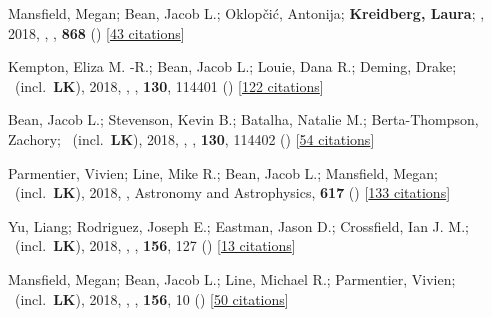 \item[{\color{numcolor}\scriptsize25}] Mansfield, Megan; Bean, Jacob L.; Oklop{\v{c}}i{\'c}, Antonija; \textbf{Kreidberg, Laura}; \etal, 2018, , \apj, \textbf{868} () [\href{https://ui.adsabs.harvard.edu/abs/2018ApJ...868L..34M}{43 citations}]

\item[{\color{numcolor}\scriptsize24}] Kempton, Eliza M. -R.; Bean, Jacob L.; Louie, Dana R.; Deming, Drake; \etal\ (incl.\ \textbf{LK}), 2018, , \pasp, \textbf{130}, 114401 () [\href{https://ui.adsabs.harvard.edu/abs/2018PASP..130k4401K}{122 citations}]

\item[{\color{numcolor}\scriptsize23}] Bean, Jacob L.; Stevenson, Kevin B.; Batalha, Natalie M.; Berta-Thompson, Zachory; \etal\ (incl.\ \textbf{LK}), 2018, , \pasp, \textbf{130}, 114402 () [\href{https://ui.adsabs.harvard.edu/abs/2018PASP..130k4402B}{54 citations}]

\item[{\color{numcolor}\scriptsize22}] Parmentier, Vivien; Line, Mike R.; Bean, Jacob L.; Mansfield, Megan; \etal\ (incl.\ \textbf{LK}), 2018, , Astronomy and Astrophysics, \textbf{617} () [\href{https://ui.adsabs.harvard.edu/abs/2018A&A...617A.110P}{133 citations}]

\item[{\color{numcolor}\scriptsize21}] Yu, Liang; Rodriguez, Joseph E.; Eastman, Jason D.; Crossfield, Ian J. M.; \etal\ (incl.\ \textbf{LK}), 2018, , \aj, \textbf{156}, 127 () [\href{https://ui.adsabs.harvard.edu/abs/2018AJ....156..127Y}{13 citations}]

\item[{\color{numcolor}\scriptsize20}] Mansfield, Megan; Bean, Jacob L.; Line, Michael R.; Parmentier, Vivien; \etal\ (incl.\ \textbf{LK}), 2018, , \aj, \textbf{156}, 10 () [\href{https://ui.adsabs.harvard.edu/abs/2018AJ....156...10M}{50 citations}]

